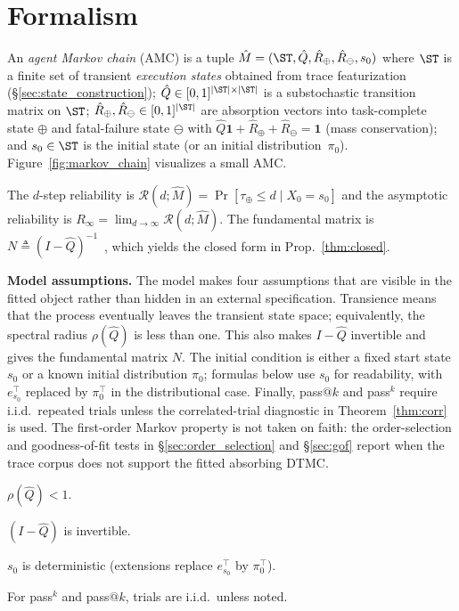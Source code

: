 \section{Formalism}
\label{sec:formal}

\begin{definition}\label{def:amc}
An \emph{agent Markov chain} (AMC) is a tuple
$\hat M=(\ST,\hat Q,\hat R_\oplus,\hat R_\ominus,s_0)$
where $\ST$ is a finite set of transient \emph{execution states}
obtained from trace featurization
(\S\ref{sec:state_construction}); $\hat Q\in[0,1]^{|\ST|\times|\ST|}$
is a substochastic transition matrix on $\ST$;
$\hat R_\oplus,\hat R_\ominus\in[0,1]^{|\ST|}$ are absorption vectors
into task-complete state $\oplus$ and fatal-failure state
$\ominus$ with $\hat Q\mathbf{1}+\hat R_\oplus+\hat R_\ominus=\mathbf{1}$
(mass conservation); and $s_0\in\ST$ is the initial state (or an
initial distribution~$\pi_0$). Figure~\ref{fig:markov_chain}
visualizes a small AMC.
\end{definition}

\begin{definition}[Reliability]\label{def:reliab}
The $d$-step reliability is
$\mathcal R(d;\hat M)=\Pr[\tau_\oplus\le d\mid X_0=s_0]$
and the asymptotic reliability is
$R_\infty=\lim_{d\to\infty}\mathcal R(d;\hat M)$. The fundamental
matrix is $N\triangleq(I-\hat Q)^{-1}$~\cite{kemenysnell}, which
yields the closed form in Prop.~\ref{thm:closed}.
\end{definition}

\noindent\textbf{Model assumptions.}
The model makes four assumptions that are visible in the fitted
object rather than hidden in an external specification. Transience
means that the process eventually leaves the transient state space;
equivalently, the spectral radius $\rho(\hat Q)$ is less than one.
This also makes $I-\hat Q$ invertible and gives the fundamental
matrix $N$. The initial condition is either a fixed start state $s_0$
or a known initial distribution $\pi_0$; formulas below use $s_0$ for
readability, with $e_{s_0}^{\top}$ replaced by $\pi_0^{\top}$ in the
distributional case. Finally, pass$@k$ and pass$^k$ require
i.i.d.\ repeated trials unless the correlated-trial diagnostic in
Theorem~\ref{thm:corr} is used. The first-order Markov property is
not taken on faith: the order-selection and goodness-of-fit tests in
\S\ref{sec:order_selection} and \S\ref{sec:gof} report when the trace
corpus does not support the fitted absorbing DTMC.

\begin{assumption}[Transience]\label{A:trans}
$\rho(\hat Q)<1$.
\end{assumption}
\begin{assumption}[Invertibility]\label{A:inv}
$(I-\hat Q)$ is invertible.
\end{assumption}
\begin{assumption}\label{A:init}
$s_0$ is deterministic (extensions replace $e_{s_0}^\top$ by
$\pi_0^\top$).
\end{assumption}
\begin{assumption}[I.i.d.\ replications]\label{A:iid}
For pass$^k$ and pass$@k$, trials are i.i.d.\ unless noted.
\end{assumption}

